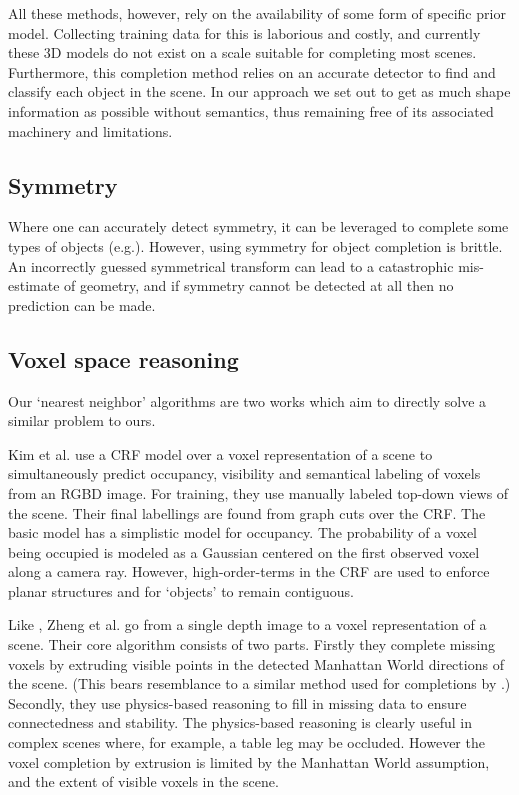 \documentclass[10pt,twocolumn,letterpaper]{article}
\makeatletter
\renewcommand*{\eg}{e.g.\@\xspace}
\newcommand*{\ea}{et al.\@\xspace}
\makeatother
\begin{document}
All these methods, however, rely on the availability of some form of specific prior model.
Collecting training data for this is laborious and costly, and currently these 3D models do not exist on a scale suitable for completing most scenes.
Furthermore, this completion method relies on an accurate detector to find and classify each object in the scene.
In our approach we set out to get as much shape information as possible without semantics, thus remaining free of its associated machinery and limitations.



\subsection{Symmetry}
Where one can accurately detect symmetry, it can be leveraged to complete some types of objects (\eg \cite{law-cviu-2010, thrun-iccv-2005, kroemer-humanoids-2012}). 
However, using symmetry for object completion is brittle.
An incorrectly guessed symmetrical transform can lead to a catastrophic mis-estimate of geometry, and if symmetry cannot be detected at all then no prediction can be made.


\subsection{Voxel space reasoning}

Our `nearest neighbor' algorithms are two works which aim to directly solve a similar problem to ours.

Kim \ea \cite{kim-iccv-2013} use a CRF model over a voxel representation of a scene to simultaneously predict occupancy, visibility and semantical labeling of voxels from an RGBD image. 
For training, they use manually labeled top-down views of the scene.
Their final labellings are found from graph cuts over the CRF.
The basic model has a simplistic model for occupancy. 
The probability of a voxel being occupied is modeled as a Gaussian centered on the first observed voxel along a camera ray.
However, high-order-terms in the CRF are used to enforce planar structures and for `objects' to remain contiguous.

Like \cite{kim-iccv-2013},  Zheng \ea \cite{zheng-cvpr-2013} go from a single depth image to a voxel representation of a scene.
Their core algorithm consists of two parts.
Firstly they complete missing voxels by extruding visible points in the detected Manhattan World directions of the scene.
(This bears resemblance to a similar method used for completions by \cite{kroemer-humanoids-2012}.)
Secondly, they use physics-based reasoning to fill in missing data to ensure connectedness and stability.
The physics-based reasoning is clearly useful in complex scenes where, for example, a table leg may be occluded.
However the voxel completion by extrusion is limited by the Manhattan World assumption, and the extent of visible voxels in the scene.
\end{document}
